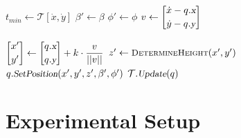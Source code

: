 \documentclass[12pt]{article}
\newcommand{\Function}[1]{\ensuremath{{\small \textsc{#1}}}}
\newcommand{\Var}[1]{\ensuremath{{\small{\textsl{#1}}}}}
\begin{document}
\begin{algorithm}[ht]
\begin{algorithmic}[1]
\STATE


\STATE $t_{min} \leftarrow \mathcal{T}[\dot{x}, \dot{y}]$
\STATE $\beta' \leftarrow \beta$
\STATE $\phi' \leftarrow \phi$
\STATE $v \leftarrow \begin{bmatrix}
    \dot{x} - q.\Var{x} \\[0.2em]
    \dot{y} - q.\Var{y}
\end{bmatrix}$

\ENDIF

\ENDFOR

\ENDFOR

\ENDFOR

\STATE

\STATE $\begin{bmatrix}
    x' \\[0.2em]
    y' 
\end{bmatrix} \leftarrow \begin{bmatrix}
    q.\Var{x} \\[0.2em]
    q.\Var{y}
\end{bmatrix} + k \cdot \mathlarger{\frac{v}{||v||}}$
\STATE $z' \leftarrow \Function{DetermineHeight}(x', y')$
\STATE $q.\Var{SetPosition}(x', y', z', \beta', \phi')$
\STATE $\mathcal{T}.\Var{Update}(q)$

\ENDFOR

\ENDWHILE

\end{algorithmic}
\end{algorithm}


\section{Experimental Setup}
\end{document}
